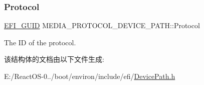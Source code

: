 \subsubsection{\texorpdfstring{Protocol}{Protocol}}
{\footnotesize\ttfamily \hyperlink{_uefi_base_type_8h_ad87614428813f71edb2c2d802e9ce2af}{E\+F\+I\+\_\+\+G\+U\+ID} M\+E\+D\+I\+A\+\_\+\+P\+R\+O\+T\+O\+C\+O\+L\+\_\+\+D\+E\+V\+I\+C\+E\+\_\+\+P\+A\+T\+H\+::\+Protocol}

The ID of the protocol. 

该结构体的文档由以下文件生成\+:\begin{DoxyCompactItemize}
\item 
E\+:/\+React\+O\+S-\/0../boot/environ/include/efi/\hyperlink{_device_path_8h}{Device\+Path.\+h}\end{DoxyCompactItemize}
